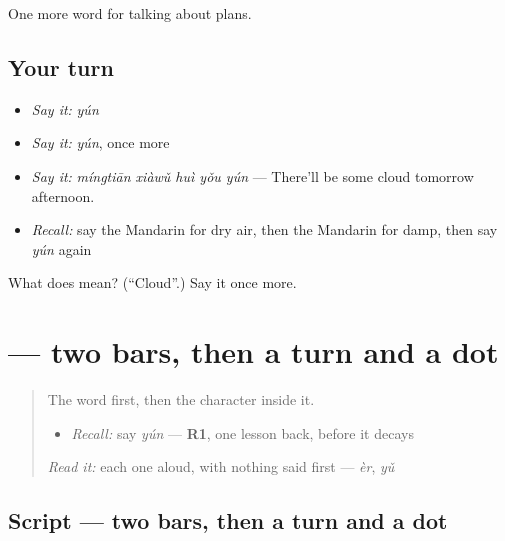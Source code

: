 \begin{grammarlens}[title={What you've built}]
One more word for talking about plans.
\end{grammarlens}

\subsection*{Your turn}
\begin{itemize}
\raggedright
  \item \emph{Say it:} \emph{yún}
  \item \emph{Say it:} \emph{yún}, once more
  \item \emph{Say it:} \emph{míngtiān xiàwǔ huì yǒu yún} — There'll be some cloud tomorrow afternoon.
  \item \emph{Recall:} say the Mandarin for dry air, then the Mandarin for damp, then say \emph{yún} again
\end{itemize}

\begin{tcolorbox}[breakable,colback=teal!4,colframe=teal!35!black,title={Before you move on}]
What does  mean? (\textquotedblleft{}Cloud\textquotedblright{}.) Say it once more.
\end{tcolorbox}
\section[\texorpdfstring{\zh{云} (yún)}{云 (yún)}]{ — two bars, then a turn and a dot}

\label{lesson:ZH-W219-yun-cloud}



\begin{quote}
The word first, then the character inside it.

\begin{itemize}
\raggedright
  \item \emph{Recall:} say \emph{yún} — \textbf{R1}, one lesson back, before it decays
\end{itemize}

\begin{quote}
 
\end{quote}

\emph{Read it:} each one aloud, with nothing said first — \emph{èr}, \emph{yǔ}
\end{quote}

\subsection*{Script — two bars, then a turn and a dot}

